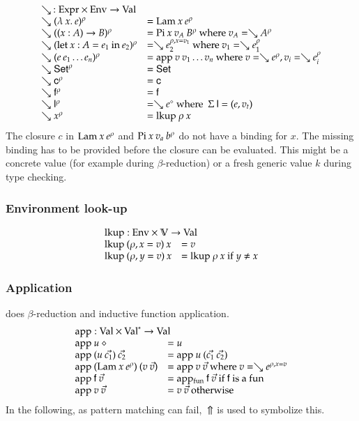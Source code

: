 \[
\begin{array}{ll}
\multicolumn{2}{l}{\wh \: : \Expr \times \Env \ra \Val}\\
\wh \clp{\lam{x}{e}}{\rho} & = \vlam \: x \: \cl{e}{\rho} \\
\wh \clp{\EPi{x}{A}{B}}{\rho} &= \vpi \: x \: v_A \: \cl{B}{\rho} \mbox{ where } v_A = \wh \cl{A}{\rho} \\
\wh \clp{\ELet{x}{A}{e_1}{e_2}}{\rho} &= \wh \cl{e_2}{\ins{\rho}{x}{v_1}} \mbox { where } v_1 = \wh \cl{e_1}{\rho} \\
\wh \clp{e \: e_1 \ldots e_n}{\rho} &= \ap \: v \: v_1 \ldots v_n \mbox{ where } v = \wh \cl{e}{\rho} , v_i = \wh \cl{e_i}{\rho}\\
\wh \cl{\Set}{\rho} & = \Set \\ 
\wh \cl{\cc}{\rho} & = \cc  \\
\wh \cl{\ff}{\rho} & = \ff \\
\wh \cl{\dd}{\rho} & = \wh \cl{e}{\diamond} \mbox{ where } \: \Sig \: \dd = (e,v_t)\\
\wh \cl{x}{\rho} & = \lkup \: \rho \: x \\
\end{array}
\]
The closure $c$  in $\mathrm{Lam} \: x \: e^{\rho}$
and $\mathrm{Pi} \: x \: v_a \: b^{\rho}$ do not have a binding for $x$.
The missing binding has to be provided before the closure can be evaluated.
This might be a concrete value (for example during $\beta$-reduction) or a
fresh generic value $k$ during type checking.

\subsubsection{Environment look-up}
\[
\begin{array}{ll}
\multicolumn{2}{l}{\lkup : \Env \times \cV \ra \Val }\\
\lkup \: (\ins{\rho}{x}{v}) \: x & = v \\
\lkup \: (\ins{\rho}{y}{v}) \: x & = \lkup \: \rho \: x \mbox{ if } y \neq x  
\end{array}
\]

\subsubsection{Application}
does $\beta$-reduction and inductive function application. 
\[
\begin{array}{ll}
\multicolumn{2}{l}{\ap : \Val \times \ves{\Val} \ra \Val}\\
\ap \: u \: \diamond & = u \\
\ap \: (u \: \vec{c_1}) \: \vec{c_2} & = \ap \: u \: (\vec{c_1}\:\vec{c_2})\\
\ap \: (\vlam \: x \: \cl{e}{\rho}) \: (v \: \vec{v}) & = \ap \: v \: \vec{v} \mbox{ where } v = \wh \cl{e}{\ins{\rho}{x}{v}} \\ 
\ap \: \ff \: \vec{v} & = \apf \: \ff \: \vec{v} \mbox{ if } \ff \mbox{ is a } \fun \\ 
\ap \: v \: \vec{v} & = v \: \vec{v} \mbox{ otherwise } \\
\end{array}
\]
In the following, as pattern matching can fail, $\:\Uparrow$ is used to symbolize this. 
